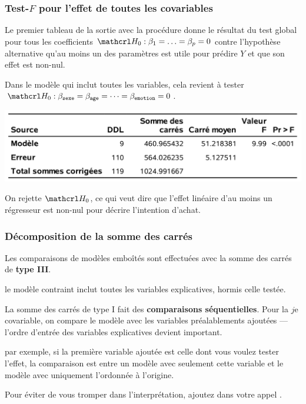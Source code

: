 \documentclass[xcolor={dvipsnames}]{beamer}
\begin{document}
\begin{frame}[fragile]
\frametitle{Test-$F$ pour l'effet de toutes les covariables}
\bi
\item Le premier tableau de la sortie \SASlang avec la procédure  donne le résultat du test global pour tous les coefficients $\Hy_0: \beta_1 = \ldots = \beta_p=0$ contre l'hypothèse alternative qu'au moins un des paramètres est utile pour prédire $Y$ et que son effet est non-nul.
\item Dans le modèle qui inclut toutes les variables, cela revient à tester $\Hy_0:  \beta_{\code{sexe}}=\beta_{\code{age}}=\cdots =\beta_{\code{emotion}}=0$.
\begin{center}
\includegraphics[width = 0.7\linewidth]{img/c2/diapos3-e12}
\end{center}
\item On rejette $\Hy_0$, ce qui veut dire que l'effet linéaire d'au moins un régresseur est non-nul pour décrire l'intention d'achat.
\ei
\end{frame}



\begin{frame}[fragile]
\frametitle{Décomposition de la somme des carrés}
 \bi \item Les comparaisons de modèles emboîtés sont effectuées avec la somme des carrés de \textbf{type III}.
 \bi \item le modèle contraint inclut toutes les variables explicatives, hormis celle testée.
 \ei \item La somme des carrés de type I fait des \textbf{comparaisons séquentielles}. Pour la $j$e covariable, on compare le modèle avec les variables préalablements ajoutées --- l'ordre d'entrée des variables explicatives devient important.
 \bi \item par exemple, si la première variable ajoutée est celle dont vous voulez tester l'effet, la comparaison est entre un modèle avec seulement cette variable et le modèle avec uniquement l'ordonnée à l'origine.
 \ei
 \item Pour éviter de vous tromper dans l'interprétation, ajoutez  dans votre appel \SASlang.
 \ei 
\end{frame}
\end{document}
